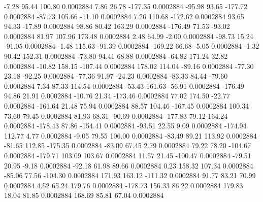        -7.28       95.44      100.80     0.0002884
        7.86       26.78     -177.35     0.0002884
      -95.98       93.65     -177.72     0.0002884
      -87.73      105.66      -11.10     0.0002884
        7.26      110.68     -172.62     0.0002884
       93.65       94.33      -17.89     0.0002884
       98.86       80.42      163.29     0.0002884
     -176.49       71.53      -93.02     0.0002884
       81.97      107.96      173.48     0.0002884
        2.48       64.99       -2.00     0.0002884
      -98.73       15.24      -91.05     0.0002884
       -1.48      115.63      -91.39     0.0002884
     -169.22       66.68       -5.05     0.0002884
       -1.32       90.42      152.31     0.0002884
      -73.80       94.41       68.88     0.0002884
      -64.82      171.24       32.82     0.0002884
      -10.82      158.15     -107.44     0.0002884
      178.02      114.04      -89.16     0.0002884
      -77.30       23.18      -92.25     0.0002884
      -77.36       91.97      -24.23     0.0002884
      -83.33       84.44      -79.60     0.0002884
        7.34       87.33      114.54     0.0002884
      -53.43      161.63      -56.91     0.0002884
     -176.49       94.86       21.91     0.0002884
      -10.76       21.34     -173.46     0.0002884
       77.02      174.50      -22.77     0.0002884
     -161.64       21.48       75.94     0.0002884
       88.57      104.46     -167.45     0.0002884
      100.34       73.60       79.45     0.0002884
       81.93       68.31      -90.69     0.0002884
     -177.83       79.12      164.24     0.0002884
     -178.43       87.86     -154.41     0.0002884
      -93.51       22.55        9.09     0.0002884
     -174.94      112.77        4.77     0.0002884
       -9.05       79.55      106.00     0.0002884
      -83.49       89.21      113.92     0.0002884
      -81.65      112.85     -175.35     0.0002884
      -83.09       67.45        2.79     0.0002884
       79.22       78.20     -104.67     0.0002884
     -179.71      103.09      103.67     0.0002884
       11.57       21.45     -100.47     0.0002884
      -79.51       20.95       -9.18     0.0002884
      -92.18       61.98       89.66     0.0002884
        0.23      158.32      107.34     0.0002884
      -85.06       77.56     -104.30     0.0002884
      171.93      163.12     -111.32     0.0002884
       91.77       83.21       70.99     0.0002884
        4.52       65.24      179.76     0.0002884
     -178.73      156.33       86.22     0.0002884
      179.83       18.04       81.85     0.0002884
      168.69       85.81       67.04     0.0002884
